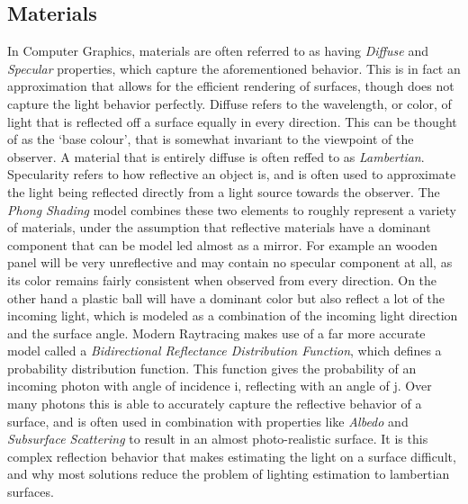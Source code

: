 \documentclass[ %
                    author={Gavin Parker},
                supervisor={Dr. Neill Campbell},
                    degree={MEng},
                     title={Deep Learning for Illumination Estimation from Stereo Images},
                  subtitle={},
                      type={Research},
                      year={2018} ]{dissertation}
\begin{document}
\subsection{Materials}
In Computer Graphics, materials are often referred to as having \textit{Diffuse} and \textit{Specular} properties, which capture the aforementioned behavior. This is in fact an approximation that allows for the efficient rendering of surfaces, though does not capture the light behavior perfectly. Diffuse refers to the wavelength, or color, of light that is reflected off a surface equally in every direction. This can be thought of as the `base colour', that is somewhat invariant to the viewpoint of the observer. A material that is entirely diffuse is often reffed to as \textit{Lambertian}. Specularity refers to how reflective an object is, and is often used to approximate the light being reflected directly from a light source towards the observer. The \textit{Phong Shading} model combines these two elements to roughly represent a variety of materials, under the assumption that reflective materials have a dominant component that can be model led almost as a mirror. For example an wooden panel will be very unreflective and may contain no specular component at all, as its color remains fairly consistent when observed from every direction. On the other hand a plastic ball will have a dominant color but also reflect a lot of the incoming light, which is modeled as a combination of the incoming light direction and the surface angle. Modern Raytracing makes use of a far more accurate model called a \textit{Bidirectional Reflectance Distribution Function}, which defines a probability distribution function. This function gives the probability of an incoming photon with angle of incidence i, reflecting with an angle of j. Over many photons this is able to accurately capture the reflective behavior of a surface, and is often used in combination with properties like \textit{Albedo} and \textit{Subsurface Scattering} to result in an almost photo-realistic surface. It is this complex reflection behavior that makes estimating the light on a surface difficult, and why most solutions reduce the problem of lighting estimation to lambertian surfaces.
\end{document}
